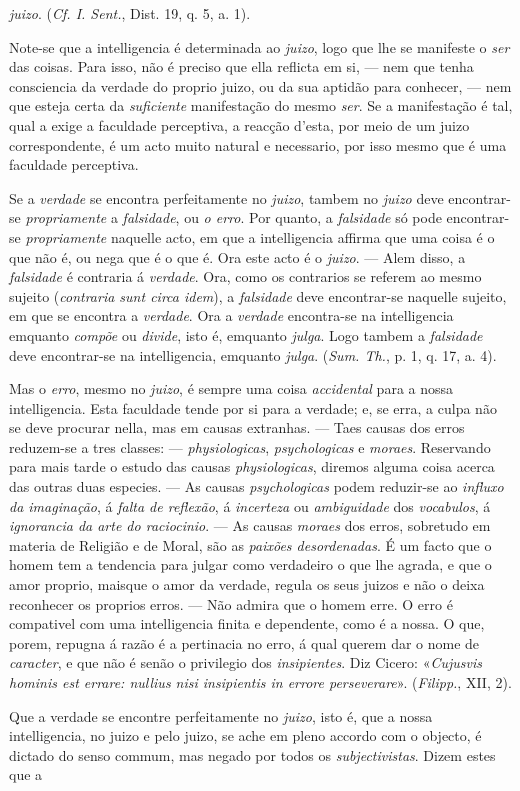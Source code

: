 \emph{juizo}. (\emph{Cf. I. Sent.}, Dist. 19, q. 5, a. 1).\par Note-se que a intelligencia é determinada ao \emph{juizo}, logo que lhe se manifeste o \emph{ser} das coisas. Para isso, não é preciso que ella reflicta em si, --- nem que tenha consciencia da verdade do proprio juizo, ou da sua aptidão para conhecer, --- nem que esteja certa da \emph{suficiente} manifestação do mesmo \emph{ser}. Se a manifestação é tal, qual a exige a faculdade perceptiva, a reacção d'esta, por meio de um juizo correspondente, é um acto muito natural e necessario, por isso mesmo que é uma faculdade perceptiva.\par Se a \emph{verdade} se encontra perfeitamente no \emph{juizo}, tambem no \emph{juizo} deve encontrar-se \emph{propriamente} a \emph{falsidade}, ou \emph{o erro}. Por quanto, a \emph{falsidade} só pode encontrar-se \emph{propriamente} naquelle acto, em que a intelligencia affirma que uma coisa é o que não é, ou nega que é o que é. Ora este acto é o \emph{juizo}. --- Alem disso, a \emph{falsidade} é contraria á \emph{verdade}. Ora, como os contrarios se referem ao mesmo sujeito (\emph{contraria sunt circa idem}), a \emph{falsidade} deve encontrar-se naquelle sujeito, em que se encontra a \emph{verdade}. Ora a \emph{verdade} encontra-se na intelligencia emquanto \emph{compõe} ou \emph{divide}, isto é, emquanto \emph{julga}. Logo tambem a \emph{falsidade} deve encontrar-se na intelligencia, emquanto \emph{julga}. (\emph{Sum. Th.}, p. 1, q. 17, a. 4).\par Mas o \emph{erro}, mesmo no \emph{juizo}, é sempre uma coisa \emph{accidental} para a nossa intelligencia. Esta faculdade tende por si para a verdade; e, se erra, a culpa não se deve procurar nella, mas em causas extranhas. --- Taes causas dos erros reduzem-se a tres classes: --- \emph{physiologicas}, \emph{psychologicas} e \emph{moraes}. Reservando para mais tarde o estudo das causas \emph{physiologicas}, diremos alguma coisa acerca das outras duas especies. --- As causas \emph{psychologicas} podem reduzir-se ao \emph{influxo da imaginação}, á \emph{falta de reflexão}, á \emph{incerteza} ou \emph{ambiguidade} dos \emph{vocabulos}, á \emph{ignorancia da arte do raciocinio}. --- As causas \emph{moraes} dos erros, sobretudo em materia de Religião e de Moral, são as \emph{paixões desordenadas}. É um facto que o homem tem a tendencia para julgar como verdadeiro o que lhe agrada, e que o amor proprio, maisque o amor da verdade, regula os seus juizos e não o deixa reconhecer os proprios erros. --- Não admira que o homem erre. O erro é compativel com uma intelligencia finita e dependente, como é a nossa. O que, porem, repugna á razão é a pertinacia no erro, á qual querem dar o nome de \emph{caracter}, e que não é senão o privilegio dos \emph{insipientes}. Diz Cicero: «\emph{Cujusvis hominis est errare: nullius nisi insipientis in errore perseverare}». (\emph{Filipp.}, XII, 2).\par Que a verdade se encontre perfeitamente no \emph{juizo}, isto é, que a nossa intelligencia, no juizo e pelo juizo, se ache em pleno accordo com o objecto, é dictado do senso commum, mas negado por todos os \emph{subjectivistas}. Dizem estes que a 